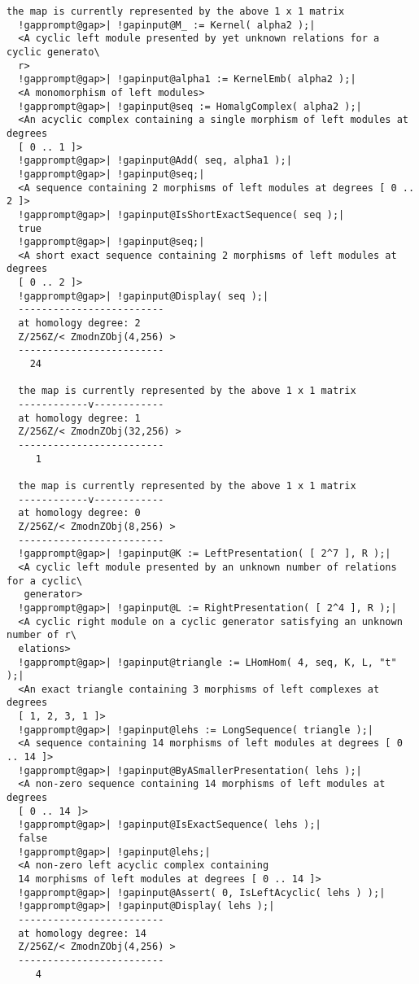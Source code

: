 \documentclass[a4paper,11pt]{report}
\begin{document}
{{\begin{Verbatim}[commandchars=!@|,fontsize=\small,frame=single,label=Example]
  the map is currently represented by the above 1 x 1 matrix
  !gapprompt@gap>| !gapinput@M_ := Kernel( alpha2 );|
  <A cyclic left module presented by yet unknown relations for a cyclic generato\
  r>
  !gapprompt@gap>| !gapinput@alpha1 := KernelEmb( alpha2 );|
  <A monomorphism of left modules>
  !gapprompt@gap>| !gapinput@seq := HomalgComplex( alpha2 );|
  <An acyclic complex containing a single morphism of left modules at degrees 
  [ 0 .. 1 ]>
  !gapprompt@gap>| !gapinput@Add( seq, alpha1 );|
  !gapprompt@gap>| !gapinput@seq;|
  <A sequence containing 2 morphisms of left modules at degrees [ 0 .. 2 ]>
  !gapprompt@gap>| !gapinput@IsShortExactSequence( seq );|
  true
  !gapprompt@gap>| !gapinput@seq;|
  <A short exact sequence containing 2 morphisms of left modules at degrees 
  [ 0 .. 2 ]>
  !gapprompt@gap>| !gapinput@Display( seq );|
  -------------------------
  at homology degree: 2
  Z/256Z/< ZmodnZObj(4,256) > 
  -------------------------
    24
  
  the map is currently represented by the above 1 x 1 matrix
  ------------v------------
  at homology degree: 1
  Z/256Z/< ZmodnZObj(32,256) > 
  -------------------------
     1
  
  the map is currently represented by the above 1 x 1 matrix
  ------------v------------
  at homology degree: 0
  Z/256Z/< ZmodnZObj(8,256) > 
  -------------------------
  !gapprompt@gap>| !gapinput@K := LeftPresentation( [ 2^7 ], R );|
  <A cyclic left module presented by an unknown number of relations for a cyclic\
   generator>
  !gapprompt@gap>| !gapinput@L := RightPresentation( [ 2^4 ], R );|
  <A cyclic right module on a cyclic generator satisfying an unknown number of r\
  elations>
  !gapprompt@gap>| !gapinput@triangle := LHomHom( 4, seq, K, L, "t" );|
  <An exact triangle containing 3 morphisms of left complexes at degrees 
  [ 1, 2, 3, 1 ]>
  !gapprompt@gap>| !gapinput@lehs := LongSequence( triangle );|
  <A sequence containing 14 morphisms of left modules at degrees [ 0 .. 14 ]>
  !gapprompt@gap>| !gapinput@ByASmallerPresentation( lehs );|
  <A non-zero sequence containing 14 morphisms of left modules at degrees 
  [ 0 .. 14 ]>
  !gapprompt@gap>| !gapinput@IsExactSequence( lehs );|
  false
  !gapprompt@gap>| !gapinput@lehs;|
  <A non-zero left acyclic complex containing 
  14 morphisms of left modules at degrees [ 0 .. 14 ]>
  !gapprompt@gap>| !gapinput@Assert( 0, IsLeftAcyclic( lehs ) );|
  !gapprompt@gap>| !gapinput@Display( lehs );|
  -------------------------
  at homology degree: 14
  Z/256Z/< ZmodnZObj(4,256) > 
  -------------------------
     4
  

\end{Verbatim}}}
\end{document}
